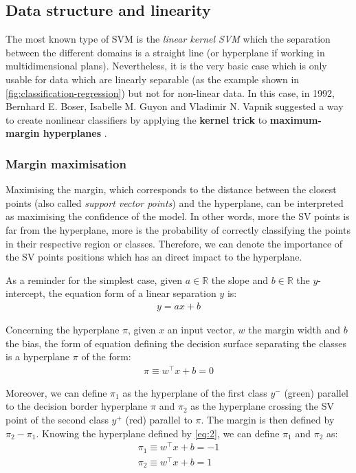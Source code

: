 \documentclass[11pt, openany]{report}
\theoremstyle{plain}
\theoremstyle{definition}
\theoremstyle{remark}
\begin{document}
\subsection{Data structure and linearity}
The most known type of SVM is the \textit{linear kernel SVM} which the separation between the different domains is a straight line (or hyperplane if working in multidimensional plans). Nevertheless, it is the very basic case which is only usable for data which are linearly separable (as the example shown in \autoref{fig:classification-regression}) but not for non-linear data. In this case, in 1992, Bernhard E. Boser, Isabelle M. Guyon and Vladimir N. Vapnik suggested a way to create nonlinear classifiers by applying the \textbf{kernel trick} to \textbf{maximum-margin hyperplanes} \cite{wiki-svm}. 

\subsubsection{Margin maximisation}
Maximising the margin, which corresponds to the distance between the closest points (also called \textit{support vector points}) and the hyperplane, can be interpreted as maximising the confidence of the model. In other words, more the SV points is far from the hyperplane, more is the probability of correctly classifying the points in their respective region or classes. Therefore, we can denote the importance of the SV points positions which has an direct impact to the hyperplane. 

As a reminder for the simplest case, given $a \in \mathbb{R}$ the slope and $b \in \mathbb{R}$ the $y$-intercept, the equation form of a linear separation $y$ is:  
\begin{align} \label{eq:1}
y = ax + b
\end{align}

Concerning the hyperplane $\pi$, given $x$ an input vector, $w$ the margin width and $b$ the bias, the form of equation defining the decision surface separating the classes is a hyperplane $\pi$ of the form: 
\begin{align} \label{eq:2}
\pi \equiv w^\top x + b = 0
\end{align}

Moreover, we can define $\pi_{1}$ as the hyperplane of the first class $y^{-}$ (green) parallel to the decision border hyperplane $\pi$ and $\pi_{2}$ as the hyperplane crossing the SV point of the second class $y^{+}$ (red) parallel to $\pi$. The margin is then defined by $\pi_{2}-\pi_{1}$. Knowing the hyperplane defined by \autoref{eq:2}, we can define $\pi_{1}$ and $\pi_{2}$ as: 
\begin{align} \label{eq:3}
\pi_{1} \equiv w^\top x + b = -1 \\
\pi_{2} \equiv w^\top x + b = 1
\end{align}
\end{document}
